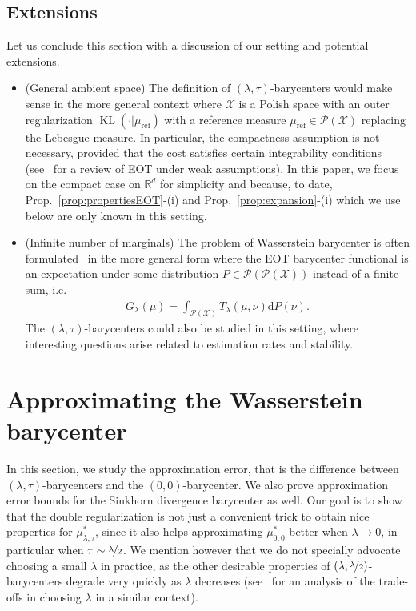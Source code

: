 \documentclass[11pt]{article}
\newcommand{\RR}{\mathbb{R}}
\newcommand{\Pp}{\mathcal{P}}
\newcommand{\Xx}{\mathcal{X}}
\renewcommand{\d}{\mathrm{d}}
\DeclareMathOperator{\KL}{KL}
\begin{document}
\subsection{Extensions}
Let us conclude this section with a discussion of our setting and potential extensions. 
\begin{itemize}
\item (General ambient space) The definition of $(\lambda,\tau)$-barycenters would make sense in the more general context where $\Xx$ is a Polish space with an outer regularization $\KL(\cdot|\mu_{\mathrm{ref}})$ with a reference measure $\mu_{\mathrm{ref}}\in \Pp(\Xx)$ replacing the Lebesgue measure. In particular, the compactness assumption is not necessary, provided that the cost satisfies certain integrability conditions (see~\cite{nutz2021introduction} for a review of EOT under weak assumptions). In this paper, we focus on the compact case on $\RR^d$ for simplicity and because, to date, Prop.~\ref{prop:propertiesEOT}-(i) and Prop.~\ref{prop:expansion}-(i) which we use below are only known in this setting.
\item (Infinite number of marginals) The problem of Wasserstein barycenter is often formulated~\cite{agueh2017vers} in the more general form where the EOT barycenter functional is an expectation under some distribution $P\in \Pp(\Pp(\Xx))$ instead of a finite sum, i.e.~
\begin{align}\label{eq:p-of-p}
G_\lambda(\mu) = \int_{\Pp(\Xx)} T_\lambda(\mu,\nu)\d P(\nu).
\end{align}
The $(\lambda,\tau)$-barycenters could also be studied in this setting, where interesting questions arise related to estimation rates and stability.
\end{itemize}

 
\section{Approximating the Wasserstein barycenter}\label{sec:approximation}
In this section, we study the approximation error, that is the difference between $(\lambda,\tau)$-barycenters and the $(0,0)$-barycenter. We also prove approximation error bounds for the Sinkhorn divergence barycenter as well. Our goal is to show that the double regularization is not just a convenient trick to obtain nice properties for $\mu^*_{\lambda,\tau}$, since it also helps approximating $\mu^*_{0,0}$ better when $\lambda\to 0$, in particular when $\tau\sim \nicefrac{\lambda}{2}$. We mention however that we do not specially advocate choosing a small $\lambda$ in practice, as the other desirable properties of $(\lambda,\nicefrac{\lambda}2)$-barycenters degrade very quickly as $\lambda$ decreases (see~\cite{chizat2020faster} for an analysis of the trade-offs in choosing $\lambda$ in a similar context).
\end{document}
